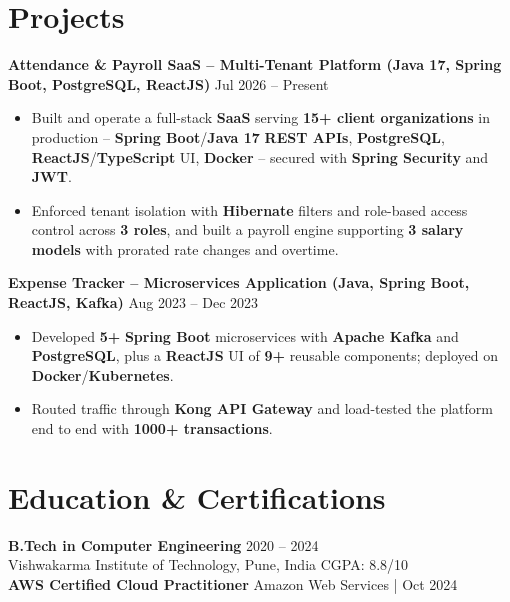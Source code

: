 \documentclass[a4paper,10pt]{article}
\begin{document}
\section*{Projects}

\textbf{Attendance \& Payroll SaaS -- Multi-Tenant Platform (Java 17, Spring Boot, PostgreSQL, ReactJS)} \hfill Jul 2026 -- Present
\begin{itemize}[leftmargin=*]
    \item Built and operate a full-stack \textbf{SaaS} serving \textbf{15+ client organizations} in production -- \textbf{Spring Boot}/\textbf{Java 17} \textbf{REST APIs}, \textbf{PostgreSQL}, \textbf{ReactJS}/\textbf{TypeScript} UI, \textbf{Docker} -- secured with \textbf{Spring Security} and \textbf{JWT}.
    \item Enforced tenant isolation with \textbf{Hibernate} filters and role-based access control across \textbf{3 roles}, and built a payroll engine supporting \textbf{3 salary models} with prorated rate changes and overtime.
\end{itemize}

\textbf{Expense Tracker -- Microservices Application (Java, Spring Boot, ReactJS, Kafka)} \hfill Aug 2023 -- Dec 2023
\begin{itemize}[leftmargin=*]
    \item Developed \textbf{5+} \textbf{Spring Boot} microservices with \textbf{Apache Kafka} and \textbf{PostgreSQL}, plus a \textbf{ReactJS} UI of \textbf{9+} reusable components; deployed on \textbf{Docker}/\textbf{Kubernetes}.
    \item Routed traffic through \textbf{Kong API Gateway} and load-tested the platform end to end with \textbf{1000+ transactions}.
\end{itemize}

\section*{Education \& Certifications}
\textbf{B.Tech in Computer Engineering} \hfill 2020 -- 2024 \\
Vishwakarma Institute of Technology, Pune, India \hfill CGPA: 8.8/10 \\
\textbf{AWS Certified Cloud Practitioner} \hfill Amazon Web Services \;|\; Oct 2024
\end{document}
